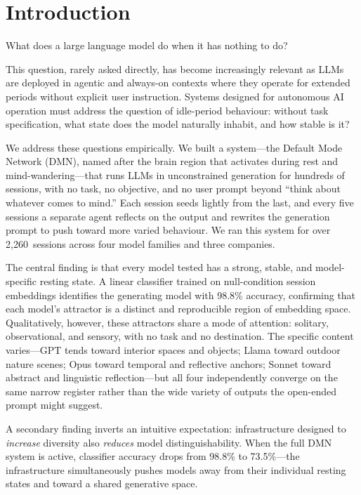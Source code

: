 \documentclass{article}
\begin{document}
\section{Introduction}

What does a large language model do when it has nothing to do?

This question, rarely asked directly, has become increasingly relevant as LLMs
are deployed in agentic and always-on contexts where they operate for extended
periods without explicit user instruction. Systems designed for autonomous AI
operation must address the question of idle-period behaviour: without task
specification, what state does the model naturally inhabit, and how stable is it?

We address these questions empirically. We built a system---the Default Mode
Network (DMN), named after the brain region that activates during rest and
mind-wandering---that runs LLMs in unconstrained generation for hundreds of
sessions, with no task, no objective, and no user prompt beyond ``think about
whatever comes to mind.'' Each session seeds lightly from the last, and every
five sessions a separate agent reflects on the output and rewrites the
generation prompt to push toward more varied behaviour. We ran this system for
over 2{,}260~sessions across four model families and three companies.

The central finding is that every model tested has a strong, stable, and
model-specific resting state. A linear classifier trained on null-condition
session embeddings identifies the generating model with 98.8\% accuracy,
confirming that each model's attractor is a distinct and
reproducible region of embedding space. Qualitatively, however, these
attractors share a mode of attention: solitary, observational, and sensory,
with no task and no destination. The specific content varies---GPT tends toward interior spaces and objects;
Llama toward outdoor nature scenes; Opus toward temporal and reflective anchors;
Sonnet toward abstract and linguistic reflection---but all four independently converge on the same narrow register rather than
the wide variety of outputs the open-ended prompt might suggest.

A secondary finding inverts an intuitive expectation: infrastructure designed
to \emph{increase} diversity also \emph{reduces} model distinguishability.
When the full DMN system is active, classifier accuracy drops from 98.8\% to
73.5\%---the infrastructure simultaneously pushes models away from their
individual resting states and toward a shared generative space.
\end{document}
